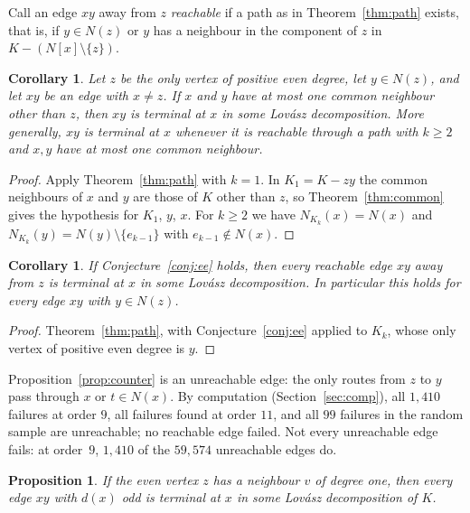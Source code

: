 \documentclass[11pt]{amsart}
\newtheorem{proposition}[theorem]{Proposition}
\newtheorem{corollary}[theorem]{Corollary}
\theoremstyle{definition}
\begin{document}
Call an edge $xy$ away from $z$ \emph{reachable} if a path as in Theorem~\ref{thm:path} exists, that
is, if $y\in N(z)$ or $y$ has a neighbour in the component of $z$ in $K-(N[x]\setminus\{z\})$.

\begin{corollary}\label{cor:adj}
Let $z$ be the only vertex of positive even degree, let $y\in N(z)$, and let $xy$ be an edge with
$x\ne z$. If $x$ and $y$ have at most one common neighbour other than $z$, then $xy$ is terminal at
$x$ in some Lov\'asz decomposition. More generally, $xy$ is terminal at $x$ whenever it is reachable
through a path with $k\ge2$ and $x,y$ have at most one common neighbour.
\end{corollary}

\begin{proof}
Apply Theorem~\ref{thm:path} with $k=1$. In $K_1=K-zy$ the common neighbours of $x$ and $y$ are those of
$K$ other than $z$, so Theorem~\ref{thm:common} gives the hypothesis for $K_1$, $y$, $x$. For $k\ge2$ we
have $N_{K_k}(x)=N(x)$ and $N_{K_k}(y)=N(y)\setminus\{e_{k-1}\}$ with $e_{k-1}\notin N(x)$.
\end{proof}

\begin{corollary}\label{cor:EEimplies}
If Conjecture~\ref{conj:ee} holds, then every reachable edge $xy$ away from $z$ is terminal at $x$ in
some Lov\'asz decomposition. In particular this holds for every edge $xy$ with $y\in N(z)$.
\end{corollary}

\begin{proof}
Theorem~\ref{thm:path}, with Conjecture~\ref{conj:ee} applied to $K_k$, whose only vertex of
positive even degree is $y$.
\end{proof}

Proposition~\ref{prop:counter} is an unreachable edge: the only routes from $z$ to $y$ pass through
$x$ or $t\in N(x)$. By computation (Section~\ref{sec:comp}), all $1{,}410$ failures at order $9$, all failures found at
order $11$, and all $99$ failures in the random sample are unreachable; no reachable edge failed. Not every
unreachable edge fails: at order~$9$, $1{,}410$ of the $59{,}574$ unreachable edges do.

\begin{proposition}\label{prop:pendant}
If the even vertex $z$ has a neighbour $v$ of degree one, then every edge $xy$ with $d(x)$ odd is
terminal at $x$ in some Lov\'asz decomposition of $K$.
\end{proposition}
\end{document}
